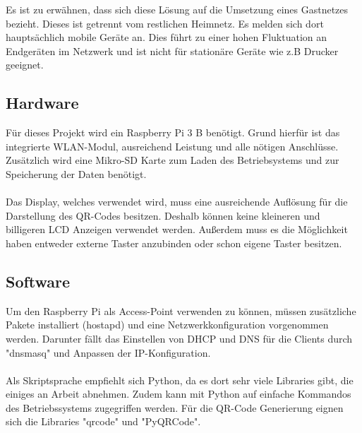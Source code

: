 \documentclass[a4paper,11pt,singlespacing]{article}
\begin{document}
    	Es ist zu erwähnen, dass sich diese Lösung auf die Umsetzung eines Gastnetzes bezieht. Dieses ist getrennt vom restlichen Heimnetz. Es melden sich dort hauptsächlich mobile Geräte an. Dies führt zu einer hohen Fluktuation an Endgeräten im Netzwerk und ist nicht für stationäre Geräte wie z.B Drucker geeignet.
    
    
    	\subsection{Hardware}
			Für dieses Projekt wird ein Raspberry Pi 3 B benötigt. Grund hierfür ist das integrierte WLAN-Modul, ausreichend Leistung und alle nötigen Anschlüsse. \\
			Zusätzlich wird eine Mikro-SD Karte zum Laden des Betriebsystems und zur Speicherung der Daten benötigt. \\ \\
			Das Display, welches verwendet wird, muss eine ausreichende Auflösung für die Darstellung des QR-Codes besitzen. Deshalb können keine kleineren und billigeren LCD Anzeigen verwendet werden. Außerdem muss es die Möglichkeit haben entweder externe Taster anzubinden oder schon eigene Taster besitzen.
		
		\subsection{Software}
			Um den Raspberry Pi als Access-Point verwenden zu können, müssen zusätzliche Pakete installiert (hostapd) und eine Netzwerkkonfiguration vorgenommen werden. Darunter fällt das Einstellen von DHCP und DNS für die Clients durch "dnsmasq" und Anpassen der IP-Konfiguration. \\ \\
		
			Als Skriptsprache empfiehlt sich Python, da es dort sehr viele Libraries gibt, die einiges an Arbeit abnehmen. Zudem kann mit Python auf einfache Kommandos des Betriebssystems zugegriffen werden. Für die QR-Code Generierung eignen sich die Libraries "qrcode" und "PyQRCode". 
		
\end{document}
